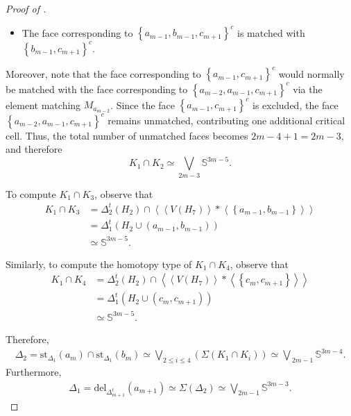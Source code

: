 \documentclass[11pt,reqno,a4paper]{amsart}
\theoremstyle{definition}
\theoremstyle{theorem}
\newcommand{\lno}{\left(}
\newcommand{\rno}{\right)}
\newcommand{\lcu}{\left\{}
\newcommand{\rcu}{\right\}}
\newcommand{\bbS}{\mathbb{S}}
\newcommand{\del}{\mathrm{del}}
\newcommand{\st}{\mathrm{st}}
\theoremstyle{remark}
\begin{document}
\begin{proof}[Proof of ]
\begin{itemize}
    \item The face corresponding to $\lcu a_{m-1}, b_{m-1}, c_{m+1} \rcu^{c}$ is matched with $\lcu b_{m-1}, c_{m+1} \rcu^{c}$.
\end{itemize}

Moreover, note that the face corresponding to $\lcu a_{m-1}, c_{m+1} \rcu^{c}$ would normally be matched with the face corresponding to $\lcu a_{m-2}, a_{m-1}, c_{m+1} \rcu^{c}$ via the element matching $M_{a_{m-2}}$. Since the face $\lcu a_{m-1}, c_{m+1} \rcu^{c}$ is excluded, the face $\lcu a_{m-2}, a_{m-1}, c_{m+1} \rcu^{c}$ remains unmatched, contributing one additional critical cell. Thus, the total number of unmatched faces becomes $2m-4 + 1 = 2m-3$, and therefore
\[
    K_1 \cap K_2 \simeq \bigvee\limits_{2m-3} \bbS^{3m-5}.
\]

To compute $K_1 \cap K_3$, observe that
\begin{align*}
    K_1 \cap K_3
        &= \Delta_2^t \lno H_2 \rno
           \cap
           \left\langle 
               \left\langle V\lno H_7 \rno \right\rangle
               * \left\langle \lcu a_{m-1}, b_{m-1} \rcu \right\rangle
           \right\rangle \\
        &= \Delta_1^t \lno H_2 \cup \lno a_{m-1}, b_{m-1} \rno \rno \\
        &\simeq \bbS^{3m-5}.
\end{align*}

Similarly, to compute the homotopy type of $K_1 \cap K_4$, observe that
\begin{align*}
    K_1 \cap K_4
        &= \Delta_2^t \lno H_2 \rno
           \cap
           \left\langle 
               \left\langle V\lno H_7 \rno \right\rangle
               * \left\langle \lcu c_m, c_{m+1} \rcu \right\rangle
           \right\rangle \\
        &= \Delta_1^t \lno H_2 \cup \lno c_m, c_{m+1} \rno \rno \\
        &\simeq \bbS^{3m-5}.
\end{align*}

Therefore,
\begin{align*}
    \Delta_2
        = \st_{\Delta_1}\lno a_m \rno
          \cap
          \st_{\Delta_1}\lno b_m \rno
        \simeq 
        \bigvee\limits_{2 \leq i \leq 4}
            \lno \Sigma \lno K_1 \cap K_i \rno \rno
        \simeq 
        \bigvee\limits_{\,2m-1}
            \bbS^{3m-4}.
\end{align*}
Furthermore,
\begin{align}\label{deletion of a_(m+1)}
    \Delta_1 = \del_{\Delta_{m+1}^t}\lno a_{m+1} \rno
    \simeq \Sigma(\Delta_2)
    \simeq \bigvee\limits_{2m-1} \bbS^{3m-3}.
\end{align}


\end{proof}
\end{document}
